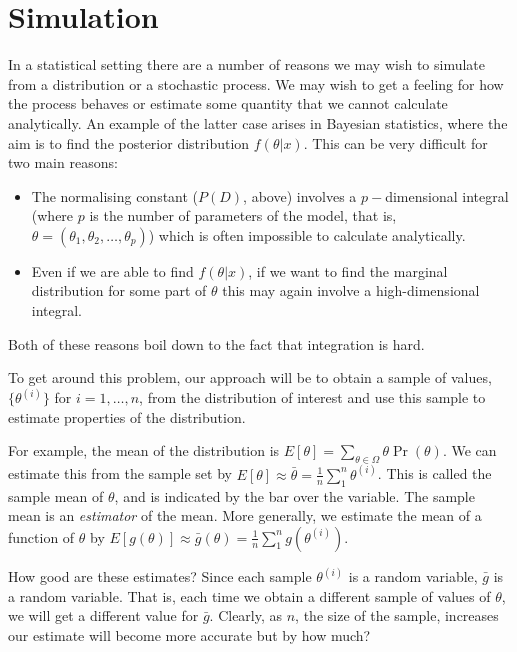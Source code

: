 \documentclass[11pt]{article}
\begin{document}
\newpage
 
 \section{Simulation}

In a statistical setting there are a number of reasons we may wish to simulate from a distribution or a stochastic process.  We may wish to get a feeling for how the process behaves or estimate some quantity that we cannot calculate analytically.   An example of the latter case arises in Bayesian statistics, where the aim is to find the posterior distribution $f(\theta|x)$.  This can be very difficult for two main reasons:
\begin{itemize}
\item The normalising constant ($P(D)$, above)  involves a $p-$dimensional integral (where $p$ is the number of parameters of the model, that is, $\theta = (\theta_1,\theta_2,\ldots,\theta_p)$)  which is often impossible to calculate analytically.
\item Even if we are able to find $f(\theta|x)$, if we want to find the marginal distribution for some part of $\theta$ this may again involve a high-dimensional integral.
\end{itemize}
Both of these reasons boil down to the fact that integration is hard.  


To get around this problem, our approach will be to obtain a  sample of values,  $\{\theta^{(i)} \}$ for $i = 1,\ldots,n$, from the distribution of interest and use this sample to estimate properties of the distribution.  

For example, the mean of the distribution is $E[\theta]  = \sum_{\theta \in  \Omega} \theta \Pr(\theta)$.  We can estimate this from the sample set   by $E[\theta] \approx \bar{\theta} =  \frac1 n \sum_1^n \theta^{(i)}$.  This is called the sample mean of $\theta$, and is indicated by the bar over the variable.  The sample mean is an {\em estimator} of the mean.  More generally, we estimate the mean of a function of $\theta$ by $E[g(\theta)] \approx \bar g (\theta)  =  \frac1 n \sum_1^n g(\theta^{(i)})$.

How good are these estimates?  Since each sample $\theta^{(i)}$ is a random variable, $\bar g$ is a random variable.  That is, each time we obtain a different sample of values of $\theta$, we will get a different value for $\bar g$.    Clearly, as $n$, the size of the sample, increases our estimate will become more accurate but by how much?
\end{document}

